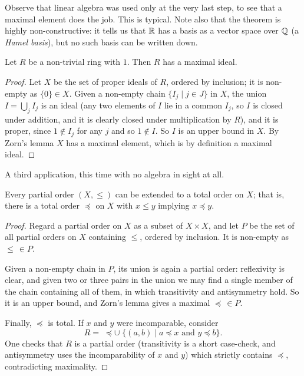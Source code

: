 \documentclass[a4paper]{scrartcl}
\begin{document}
Observe that linear algebra was used only at the very last step, to see that a maximal element does the job. This is typical. Note also that the theorem is highly non-constructive: it tells us that $\mathbb{R}$ has a basis as a vector space over $\mathbb{Q}$ (a \emph{Hamel basis}), but no such basis can be written down.

\begin{theorem}
  Let $R$ be a non-trivial ring with $1$. Then $R$ has a maximal ideal.
\end{theorem}
\begin{proof}
  Let $X$ be the set of proper ideals of $R$, ordered by inclusion; it is non-empty as $\{0\} \in X$. Given a non-empty chain $\{I_j \mid j \in J\}$ in $X$, the union $I = \bigcup_j I_j$ is an ideal (any two elements of $I$ lie in a common $I_j$, so $I$ is closed under addition, and it is clearly closed under multiplication by $R$), and it is proper, since $1 \notin I_j$ for any $j$ and so $1 \notin I$. So $I$ is an upper bound in $X$. By Zorn's lemma $X$ has a maximal element, which is by definition a maximal ideal.
\end{proof}

A third application, this time with no algebra in sight at all.

\begin{theorem}
  Every partial order $(X, \leq)$ can be extended to a total order on $X$; that is, there is a total order $\preceq$ on $X$ with $x \leq y$ implying $x \preceq y$.
\end{theorem}
\begin{proof}
  Regard a partial order on $X$ as a subset of $X \times X$, and let $P$ be the set of all partial orders on $X$ containing $\leq$, ordered by inclusion. It is non-empty as $\leq \, \in P$.

  Given a non-empty chain in $P$, its union is again a partial order: reflexivity is clear, and given two or three pairs in the union we may find a single member of the chain containing all of them, in which transitivity and antisymmetry hold. So it is an upper bound, and Zorn's lemma gives a maximal $\preceq \, \in P$.

  Finally, $\preceq$ is total. If $x$ and $y$ were incomparable, consider
  $$R = \; \preceq \cup \; \{(a, b) \mid a \preceq x \text{ and } y \preceq b\}.$$
  One checks that $R$ is a partial order (transitivity is a short case-check, and antisymmetry uses the incomparability of $x$ and $y$) which strictly contains $\preceq$, contradicting maximality.
\end{proof}
\end{document}
